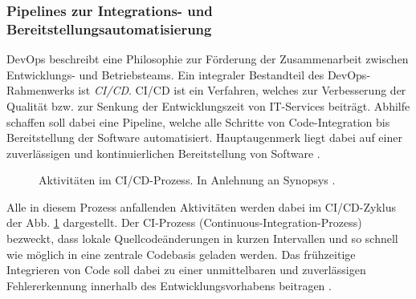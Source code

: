 \subsubsection{Pipelines zur Integrations- und Bereitstellungsautomatisierung}
\label{sec:CICD}
DevOps beschreibt eine Philosophie zur Förderung der Zusammenarbeit zwischen Entwicklungs- und Betriebsteams. Ein integraler Bestandteil des DevOps-Rahmen\-werks ist \textit{\ac{CI/CD}}. CI/CD ist ein Verfahren, welches zur Verbesserung der Qualität bzw. zur Senkung der Entwicklungszeit von IT-Services beiträgt. Abhilfe schaffen soll dabei eine Pipeline, welche alle Schritte von Code-Integration bis Bereitstellung der Software automatisiert. Hauptaugenmerk liegt dabei auf einer zuverlässigen und kontinuierlichen Bereitstellung von Software \cite[471]{Zampetti.92720211012021}.
\begin{center}
	\begin{figure}[H]
		\centering
		\captionsetup{format=myformat}
		\caption[Aktivitäten im CI/CD-Prozess]{Aktivitäten im CI/CD-Prozess. In Anlehnung an Synopsys \cite{.20230201}.}
		\label{fig:CICD_Cycle}
	\end{figure}
\end{center}
\vspace*{-15mm}
Alle in diesem Prozess anfallenden Aktivitäten werden dabei im CI/CD-Zyklus der Abb. \ref*{fig:CICD_Cycle} dargestellt. Der \acs{CI}-Prozess (Continuous-Integration-Prozess) bezweckt, dass lokale Quellcode\-änderungen in kurzen Intervallen und so schnell wie möglich in eine zentrale Codebasis geladen werden. Das frühzeitige Integrieren von Code soll dabei zu einer unmittelbaren und zuverlässigen Fehlererkennung innerhalb des Entwicklungsvorhabens beitragen \cite[471]{Zampetti.92720211012021}. 
